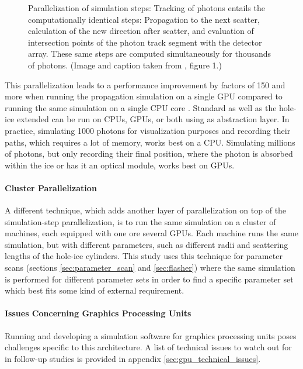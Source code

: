 \begin{figure}[htbp]
  \caption{Parallelization of simulation steps: Tracking of photons entails the computationally identical steps: Propagation to the next scatter, calculation of the new direction after scatter, and evaluation of intersection points of the photon track segment with the detector array. These same steps are computed simultaneously for thousands of photons. (Image and caption taken from \cite{ppcpaper}, figure 1.)}
  \label{fig:Id3ioyie}
\end{figure}

This parallelization leads to a performance improvement by factors of
150 and more when running the propagation simulation on a single GPU
compared to running the same simulation on a single CPU core
\cite{ppcpaper}. Standard \clsim as well as the hole-ice extended
\clsim can be run on CPUs, GPUs, or both using  as
abstraction layer. In practice, simulating 1000 photons for
visualization purposes and recording their paths, which requires a lot
of memory, works best on a CPU. Simulating millions of photons, but only
recording their final position, where the photon is absorbed within the
ice or has it an optical module, works best on GPUs.

\paragraph{Cluster Parallelization}
\label{sec:cluster_parallelization}

A different technique, which adds another layer of parallelization on
top of the simulation-step parallelization, is to run the same
simulation on a cluster of machines, each equipped with one ore several
GPUs. Each machine runs the same simulation, but with different
parameters, such as different radii and scattering lengths of the
hole-ice cylinders. This study uses this technique for parameter scans
(sections \ref{sec:parameter_scan} and \ref{sec:flasher}) where the same
simulation is performed for different parameter sets in order to find a
specific parameter set which best fits some kind of external
requirement.

\paragraph{Issues Concerning Graphics Processing Units}

Running and developing a simulation software for graphics processing
units poses challenges specific to this architecture. A list of
technical issues to watch out for in follow-up studies is provided in
appendix \ref{sec:gpu_technical_issues}.

